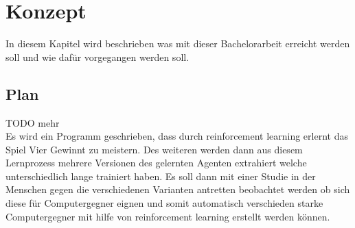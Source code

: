 \chapter{Konzept}%
       

\label{cha:Konzept}

In diesem Kapitel wird beschrieben was mit dieser Bachelorarbeit erreicht werden soll und wie dafür vorgegangen werden soll.


\section{Plan}
TODO mehr\\
Es wird ein Programm geschrieben, dass durch reinforcement learning erlernt das Spiel Vier Gewinnt zu meistern. Des weiteren werden dann aus diesem Lernprozess mehrere Versionen des gelernten Agenten extrahiert welche  unterschiedlich lange trainiert haben. Es soll dann mit einer Studie in der Menschen gegen die verschiedenen Varianten antretten beobachtet werden ob sich diese für Computergegner eignen und somit automatisch verschieden starke Computergegner mit hilfe von reinforcement learning erstellt werden können.

